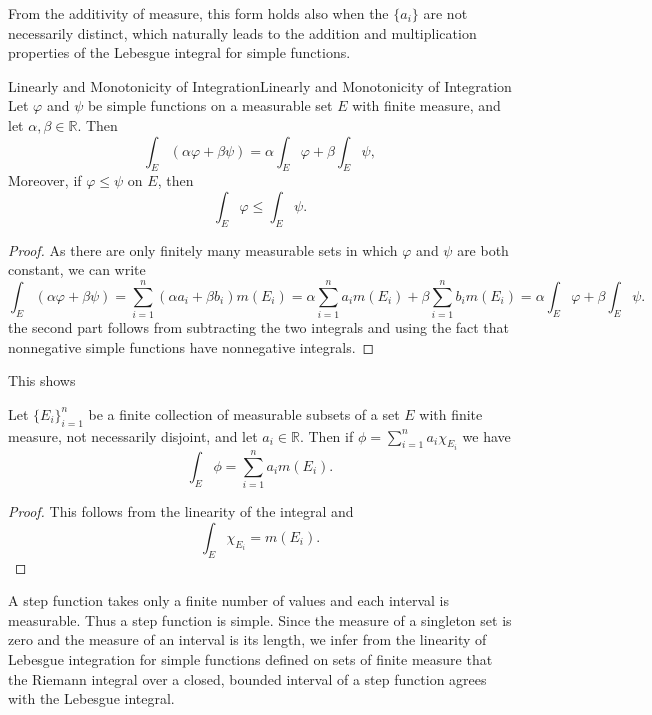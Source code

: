 \documentclass[../main.tex]{subfiles}
\begin{document}
From the additivity of measure, this form holds also when the $\{a_i\}$ are not necessarily distinct, which naturally leads to the addition and multiplication properties of the Lebesgue integral for simple functions.

\begin{proposition}{Linearly and Monotonicity of Integration}{Linearly and Monotonicity of Integration}
	Let $\varphi$ and $\psi$ be simple functions on a measurable set $E$ with finite measure, and let $\alpha, \beta \in \mathbb{R}$. Then
	\begin{equation}
		\int_E (\alpha \varphi + \beta \psi) = \alpha \int_E \varphi + \beta \int_E \psi,
	\end{equation}
	Moreover, if $\varphi \leq \psi$ on $E$, then
	\begin{equation}
		\int_E \varphi \leq \int_E \psi.
	\end{equation}
\end{proposition}
\begin{proof}
	As there are only finitely many measurable sets in which $\varphi$ and $\psi$ are both constant, we can write
	\begin{equation*}
		\int_E (\alpha \varphi + \beta \psi) = \sum_{i=1}^{n} (\alpha a_i + \beta b_i) m(E_i) = \alpha \sum_{i=1}^{n} a_i m(E_i) + \beta \sum_{i=1}^{n} b_i m(E_i) = \alpha \int_E \varphi + \beta \int_E \psi.
	\end{equation*}
	the second part follows from subtracting the two integrals and using the fact that nonnegative simple functions have nonnegative integrals.
\end{proof}

This shows
\begin{proposition}{}{}
	Let $\{E_i\}_{i=1}^{n}$ be a finite collection of measurable subsets of a set $E$ with finite measure, not necessarily disjoint, and let $a_i \in \mathbb{R}$. Then if $\phi = \sum_{i=1}^{n} a_i \chi_{E_i}$ we have
	\begin{equation}
		\int_E \phi = \sum_{i=1}^{n} a_i m(E_i).
	\end{equation}
\end{proposition}
\begin{proof}
	This follows from the linearity of the integral and
	\begin{equation*}
		\int_E \chi_{E_i} = m(E_i).
	\end{equation*}
\end{proof}

A step function takes only a finite number of values and each interval is measurable. Thus a step function is simple. Since the measure of a singleton set is zero and the measure of an interval is its length, we infer from the linearity of Lebesgue integration for simple functions defined on sets of finite measure that the Riemann integral over a closed, bounded interval of a step function agrees with the Lebesgue integral.
\end{document}
